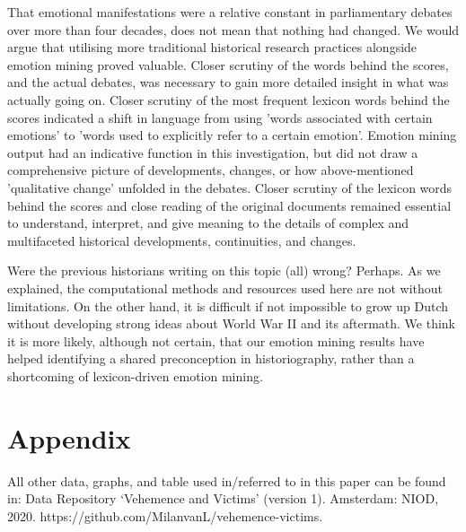 \documentclass{dhbenelux}
\begin{document}
That emotional manifestations were a relative constant in parliamentary debates over more than four decades, does not mean that nothing had changed. We would argue that utilising more traditional historical research practices alongside emotion mining proved valuable. Closer scrutiny of the words behind the scores, and the actual debates, was necessary to gain more detailed insight in what was actually going on. Closer scrutiny of the most frequent lexicon words behind the scores indicated a shift in language from using 'words associated with certain emotions' to 'words used to explicitly refer to a certain emotion'. Emotion mining output had an indicative function in this investigation, but did not draw a comprehensive picture of developments, changes, or how above-mentioned 'qualitative change' unfolded in the debates. Closer scrutiny of the lexicon words behind the scores and close reading of the original documents remained essential to understand, interpret, and give meaning to the details of complex and multifaceted historical developments, continuities, and changes.

Were the previous historians writing on this topic (all) wrong? Perhaps. As we explained, the computational methods and resources used here are not without limitations. On the other hand, it is difficult if not impossible to grow up Dutch without developing strong ideas about World War II and its aftermath. We think it is more likely, although not certain, that our emotion mining results have helped identifying a shared preconception in historiography, rather than a shortcoming of lexicon-driven emotion mining.



\newpage
\section{Appendix}
\label{sec:app}
All other data, graphs, and table used in/referred to in this paper can be found in: Data Repository ‘Vehemence and Victims’ (version 1). Amsterdam: NIOD, 2020. https://github.com/MilanvanL/vehemence-victims.
\end{document}
